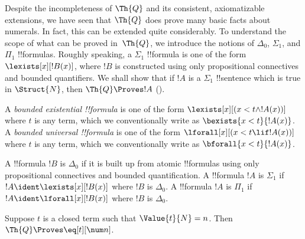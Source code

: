 \documentclass[../../../include/open-logic-section]{subfiles}
\begin{document}

Despite the incompleteness of $\Th{Q}$ and its consistent, axiomatizable
extensions, we have seen that $\Th{Q}$ does prove many basic facts about
numerals. In fact, this can be extended quite considerably. To understand
the scope of what can be proved in~$\Th{Q}$, we introduce the notions of
$\Delta_0$, $\Sigma_1$, and $\Pi_1$ !!{formula}s. Roughly speaking, a
$\Sigma_1$ !!{formula} is one of the form $\lexists[x][!B(x)]$, where $!B$
is constructed using only propositional connectives and bounded
quantifiers. We shall show that if $!A$ is a $\Sigma_1$ !!{sentence}
which is true in $\Struct{N}$, then $\Th{Q} \Proves !A$
().

\begin{defn}
A \emph{bounded existential !!{formula}} is one of the form
$\lexists[x][(x < t \land !A(x))]$ where $t$ is any term, which we
conventionally write as $\bexists{x < t}{!A(x)}$.
%
A \emph{bounded universal !!{formula}} is one of the form
$\lforall[x][(x < t \lif !A(x))]$ where $t$ is any term, which we
conventionally write as $\bforall{x < t}{!A(x)}$.
\end{defn}

\begin{defn}
A !!{formula} $!B$ is $\Delta_0$ if it is built up from atomic
!!{formula}s using only propositional connectives and bounded
quantification.
%
A !!{formula} $!A$ is $\Sigma_1$ if $!A \ident \lexists[x][!B(x)]$
where $!B$ is $\Delta_0$.
%
A !!{formula} $!A$ is $\Pi_1$ if $!A \ident \lforall[x][!B(x)]$
where $!B$ is $\Delta_0$.
\end{defn}

\begin{lem}
 Suppose $t$ is a closed term such that
$\Value{t}{N} = n$. Then $\Th{Q} \Proves \eq[t][\num n]$.
\end{lem}
\end{document}
